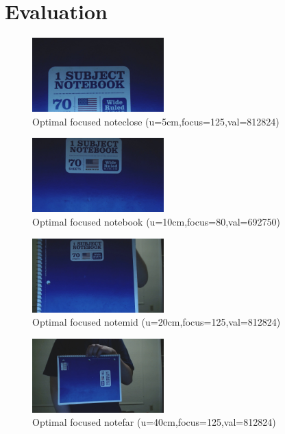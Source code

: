 \section{Evaluation}

\begin{figure}[tb!]
	\begin{center}
		\includegraphics[width=2in]{noteclose}
	\end{center}
	\caption{Optimal focused noteclose (u=5cm,focus=125,val=812824)}
	\label{f:noteclose}
\end{figure}

\begin{figure}[tb!]
	\begin{center}
		\includegraphics[width=2in]{notebook}
	\end{center}
	\caption{Optimal focused notebook (u=10cm,focus=80,val=692750)}
	\label{f:notebook}
\end{figure}

\begin{figure}[tb!]
	\begin{center}
		\includegraphics[width=2in]{notemid}
	\end{center}
	\caption{Optimal focused notemid (u=20cm,focus=125,val=812824)}
	\label{f:notemid}
\end{figure}

\begin{figure}[tb!]
	\begin{center}
		\includegraphics[width=2in]{notefar}
	\end{center}
	\caption{Optimal focused notefar (u=40cm,focus=125,val=812824)}
	\label{f:notefar}
\end{figure}

